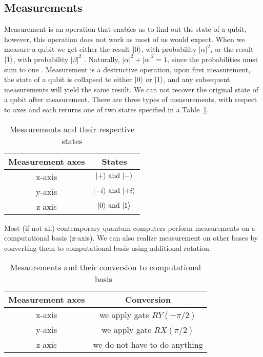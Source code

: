 \subsection{Measurements}
Measurement is an operation that enables us to find out the state of a qubit, however, this operation does not work as most of us would expect. When we measure a qubit we get either the result $\lvert0\rangle$, with probability $\lvert \alpha \rvert^2$, or the result $\lvert1\rangle$, with probability $\lvert \beta \rvert^2$ \cite{qc}. Naturally, $\lvert \alpha \rvert^2 + \lvert \alpha \rvert^2 = 1$, since the probabilities must sum to one \cite{qc}.  Measurement is a destructive operation, upon first measurement, the state of a qubit is collapsed to either $\lvert0\rangle$ or $\lvert1\rangle$, and any subsequent measurements will yield the same result. We can not recover the original state of a qubit after measurement. There are three types of measurements, with respect to axes and each returns one of two states specified in a Table~\ref{tab:measurements-states}.
\begin{table}[H]
  \centering
  \begin{tabular}{|c|c|} 
      \hline
      \multicolumn{1}{|c|}{\textbf{Measurement axes}} & \textbf{States}\\
      \hline
      x-axis & $\lvert+\rangle \text{ and }\lvert-\rangle$\\ 
      \hline
      y-axis & $\lvert-i\rangle \text{ and }\lvert+i\rangle$\\ 
      \hline
      z-axis & $\lvert0\rangle \text{ and }\lvert1\rangle$\\ 
      \hline
  \end{tabular}
  \caption{Mesaurements and their respective states}
  \label{tab:measurements-states}
\end{table}
Most (if not all) contemporary quantum computers perform measurements on a computational basis (z-axis). We can also realize measurement on other bases by converting them to computational basis using additional rotation.

\begin{table}[H]
  \centering
  \begin{tabular}{|c|c|} 
      \hline
      \multicolumn{1}{|c|}{\textbf{Measurement axes}} & \textbf{Conversion}\\
      \hline
      x-axis & we apply gate $RY(-\pi/2)$ \\ 
      \hline
      y-axis & we apply gate $RX(\pi/2)$ \\ 
      \hline
      z-axis & we do not have to do anything \\ 
      \hline
  \end{tabular}
  \caption{Mesaurements and their conversion to computational basis~\cite{blog}}
  \label{tab:measurements-conversion}
\end{table}
\\

